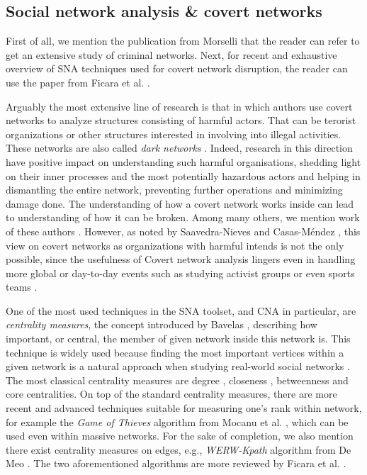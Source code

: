 \subsection{Social network analysis \& covert networks}

First of all, we mention the publication from Morselli \cite{Morselli2009} that the reader can refer to get
an extensive study of criminal networks.
Next, for recent and exhaustive overview of SNA techniques used for covert network disruption,
the reader can use the paper from Ficara et al. \cite{Ficara2022}.

Arguably the most extensive line of research is that in which authors use covert networks to analyze structures consisting of
harmful actors.
That can be terorist organizations or other structures interested in involving into illegal activities. These networks are
also called \emph{dark networks} \cite{Raab2003}.
Indeed, research in this direction have positive impact on understanding such harmful organisations,
shedding light on their inner processes and the most potentially hazardous actors and helping in dismantling the entire network,
preventing further operations and minimizing damage done.
The understanding of how a covert network works inside can lead to understanding of how it can be broken.
Among many others, we mention work of these authors \cite{Waniek2017,Dey2019,Raab2003,Lindelauf2009,Xu2005,Ressler2006}.
However, as noted by Saavedra-Nieves and Casas-Méndez \cite{SaavedraNieves2023}, this view on covert networks as organizations with harmful
intends is not the only possible, since the usefulness of Covert network analysis lingers even in handling more global or day-to-day events
such as studying activist groups \cite{Crossley2012} or even sports teams \cite{Buldú2019}.

One of the most used techniques in the SNA toolset, and CNA in particular, are \emph{centrality measures},
the concept introduced by Bavelas \cite{Bavelas1948},
describing how important, or central, the member of given network inside this network is.
This technique is widely used because finding the most important vertices within a given network is a natural approach when studying real-world social networks \cite{Crescenzi2016}.
The most classical centrality measures are degree \cite{Shaw1954}, closeness \cite{Beauchamp1965},
betweenness \cite{Anthonisse1971,Freeman1977} and core \cite{Seidman1983} centralities.
On top of the standard centrality measures, there are more recent and advanced techniques suitable for measuring one's rank within network,
for example the \emph{Game of Thieves} algorithm from Mocanu et al. \cite{Mocanu2018}, which can be used even within massive networks.
For the sake of completion, we also mention there exist centrality measures on edges, e.g.,
\emph{WERW-Kpath} algorithm from {De Meo} \cite{DeMeo2013}.
The two aforementioned algorithms are more reviewed by Ficara et al. \cite{Ficara2021}.

